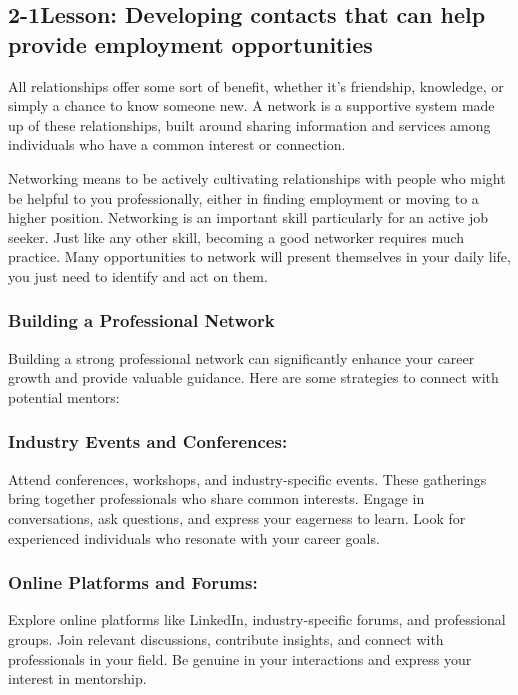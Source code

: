 \pagebreak \subsection*{2-1\quad Lesson: Developing contacts that can help provide employment opportunities}
All relationships offer some sort of benefit, whether it's friendship, knowledge, or simply a chance to know someone new. A network is a supportive system made up of these relationships, built around sharing information and services among individuals who have a common interest or connection.

Networking means to be actively cultivating relationships with people who might be helpful to you professionally, either in finding employment or moving to a higher position. Networking is an important skill particularly for an active job seeker. Just like any other skill, becoming a good networker requires much practice. Many opportunities to network will present themselves in your daily life, you just need to identify and act on them.

\subsubsection*{Building a Professional Network}
Building a strong professional network can significantly enhance your career growth and provide valuable guidance. Here are some strategies to connect with potential mentors:

\subsubsection*{Industry Events and Conferences:}
   Attend conferences, workshops, and industry-specific events. These gatherings bring together professionals who share common interests. Engage in conversations, ask questions, and express your eagerness to learn. Look for experienced individuals who resonate with your career goals.

\subsubsection*{Online Platforms and Forums:}
   Explore online platforms like LinkedIn, industry-specific forums, and professional groups. Join relevant discussions, contribute insights, and connect with professionals in your field. Be genuine in your interactions and express your interest in mentorship.


